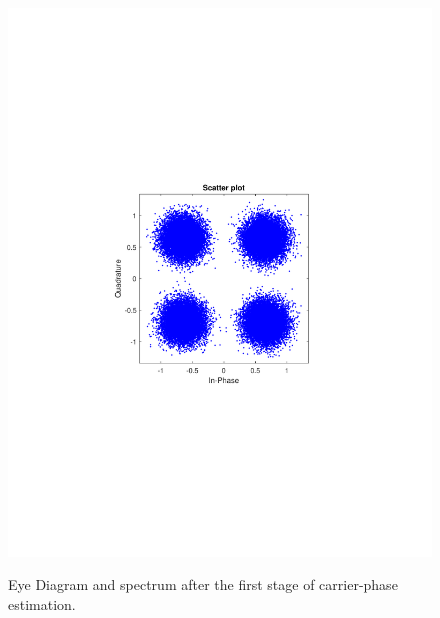 \begin{refsection}
\begin{figure}[H]
\begin{minipage}{0.30\textwidth}
		\includegraphics[clip, trim=4cm 8cm 4cm 8cm, width=1\textwidth]{./sdf/m_qam_system/figures/expResults/intradyne/5_const_4GBdInSig13dB_AfPE.pdf}
		\label{fig:4GBdSpecBefFec}
	\end{minipage}
	\caption{Eye Diagram and spectrum after the first stage of carrier-phase estimation.}
\end{figure}


\end{refsection}
